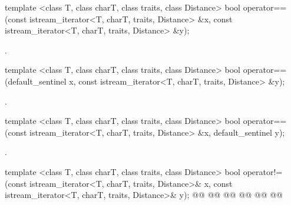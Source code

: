 %
%
\begin{itemdecl}
template <class T, class charT, class traits, class Distance>
  bool operator==(const istream_iterator<T, charT, traits, Distance> &x,
                  const istream_iterator<T, charT, traits, Distance> &y);
\end{itemdecl}

\begin{itemdescr}
\pnum
\returns
{}.%
\end{itemdescr}

\begin{addedblock}
\begin{itemdecl}
template <class T, class charT, class traits, class Distance>
  bool operator==(default_sentinel x,
                  const istream_iterator<T, charT, traits, Distance> &y);
\end{itemdecl}

\begin{itemdescr}
\pnum
\returns
{}.%
\end{itemdescr}

\begin{itemdecl}
template <class T, class charT, class traits, class Distance>
  bool operator==(const istream_iterator<T, charT, traits, Distance> &x,
                  default_sentinel y);
\end{itemdecl}

\begin{itemdescr}
\pnum
\returns
{}.%
\end{itemdescr}
\end{addedblock}

%
%
\begin{itemdecl}
template <class T, class charT, class traits, class Distance>
  bool operator!=(const istream_iterator<T, charT, traits, Distance>& x,
                  const istream_iterator<T, charT, traits, Distance>& y);
@@
  @@
                  @@
@@
  @@
                  @@
\end{itemdecl}

